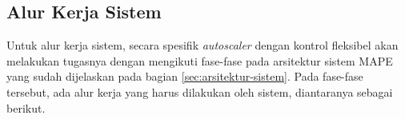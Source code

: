 





\subsection{Alur Kerja Sistem}

Untuk alur kerja sistem, secara spesifik \textit{autoscaler} dengan kontrol fleksibel akan melakukan tugasnya dengan mengikuti fase-fase pada arsitektur sistem MAPE yang sudah dijelaskan pada bagian \ref{sec:arsitektur-sistem}. Pada fase-fase tersebut, ada alur kerja yang harus dilakukan oleh sistem, diantaranya sebagai berikut.

